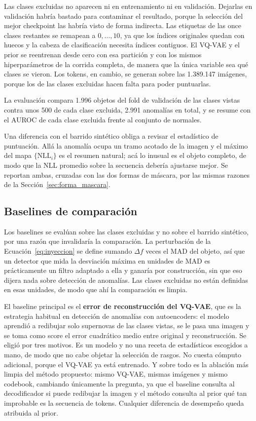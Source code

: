Las clases excluidas no aparecen ni en entrenamiento ni en validación. Dejarlas en validación habría bastado para contaminar el resultado, porque la selección del mejor checkpoint las habría visto de forma indirecta. Las etiquetas de las once clases restantes se remapean a $0,\dots,10$, ya que los índices originales quedan con huecos y la cabeza de clasificación necesita índices contiguos. El VQ-VAE y el prior se reentrenan desde cero con esa partición y con los mismos hiperparámetros de la corrida completa, de manera que la única variable sea qué clases se vieron. Los tokens, en cambio, se generan sobre las 1.389.147 imágenes, porque los de las clases excluidas hacen falta para poder puntuarlas.

La evaluación compara 1.996 objetos del fold de validación de las clases vistas contra unos 500 de cada clase excluida, 2.991 anomalías en total, y se resume con el AUROC de cada clase excluida frente al conjunto de normales.

Una diferencia con el barrido sintético obliga a revisar el estadístico de puntuación. Allá la anomalía ocupa un tramo acotado de la imagen y el máximo del mapa $\{\mathrm{NLL}_i\}$ es el resumen natural; acá lo inusual es el objeto completo, de modo que la NLL promedio sobre la secuencia debería ajustarse mejor. Se reportan ambas, cruzadas con las dos formas de máscara, por las mismas razones de la Sección~\ref{sec:forma_mascara}.

\subsection{Baselines de comparación}
\label{sec:baselines}

Los baselines se evalúan sobre las clases excluidas y no sobre el barrido sintético, por una razón que invalidaría la comparación. La perturbación de la Ecuación~\ref{eq:inyeccion} se define sumando $\Delta f$ veces el MAD del objeto, así que un detector que mida la desviación máxima en unidades de MAD es prácticamente un filtro adaptado a ella y ganaría por construcción, sin que eso dijera nada sobre detección de anomalías. Las clases excluidas no están definidas en esas unidades, de modo que ahí la comparación es limpia.

El baseline principal es el \textbf{error de reconstrucción del VQ-VAE}, que es la estrategia habitual en detección de anomalías con autoencoders: el modelo aprendió a redibujar solo supernovas de las clases vistas, se le pasa una imagen y se toma como score el error cuadrático medio entre original y reconstrucción. Se eligió por tres motivos. Es un modelo y no una receta de estadísticos escogidos a mano, de modo que no cabe objetar la selección de rasgos. No cuesta cómputo adicional, porque el VQ-VAE ya está entrenado. Y sobre todo es la ablación más limpia del método propuesto: mismo VQ-VAE, mismas imágenes y mismo codebook, cambiando únicamente la pregunta, ya que el baseline consulta al decodificador si puede redibujar la imagen y el método consulta al prior qué tan improbable es la secuencia de tokens. Cualquier diferencia de desempeño queda atribuida al prior.


